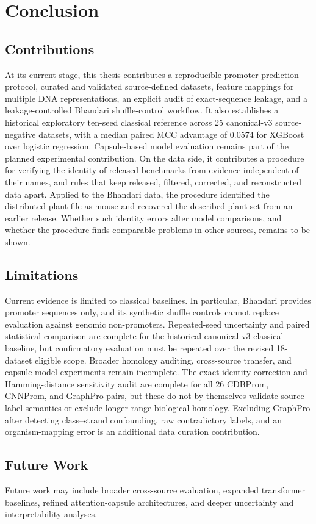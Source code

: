 \chapter{Conclusion}\label{chap:conclusion}

\section{Contributions}\label{sec:conclusion-contributions}

At its current stage, this thesis contributes a reproducible promoter-prediction
protocol, curated and validated source-defined datasets, feature mappings for
multiple DNA representations, an explicit audit of exact-sequence leakage, and
a leakage-controlled Bhandari shuffle-control workflow. It also establishes a
historical exploratory ten-seed classical reference across 25 canonical-v3
source-negative datasets, with
a median paired MCC advantage of 0.0574 for XGBoost over logistic regression.
Capsule-based model evaluation remains part of the planned experimental
contribution. On the data side, it contributes a procedure for verifying the
identity of released benchmarks from evidence independent of their names, and
rules that keep released, filtered, corrected, and reconstructed data apart.
Applied to the Bhandari data, the procedure identified the distributed plant
file as mouse and recovered the described plant set from an earlier release.
Whether such identity errors alter model comparisons, and whether the
procedure finds comparable problems in other sources, remains to be shown.

\section{Limitations}\label{sec:conclusion-limitations}

Current evidence is limited to classical baselines. In particular, Bhandari
provides promoter sequences only, and its synthetic shuffle controls cannot
replace evaluation against genomic non-promoters. Repeated-seed uncertainty and
paired statistical comparison are complete for the historical canonical-v3
classical baseline, but confirmatory evaluation must be repeated over the
revised 18-dataset eligible scope. Broader homology auditing, cross-source
transfer, and capsule-model experiments remain incomplete.
The exact-identity correction and Hamming-distance sensitivity audit are
complete for all 26 CDBProm, CNNProm, and GraphPro pairs, but these do not by
themselves validate source-label semantics or exclude longer-range biological
homology. Excluding GraphPro after detecting class--strand confounding, raw
contradictory labels, and an organism-mapping error is an additional data
curation contribution.

\section{Future Work}\label{sec:conclusion-future-work}

Future work may include broader cross-source evaluation, expanded transformer
baselines, refined attention-capsule architectures, and deeper uncertainty and
interpretability analyses.
